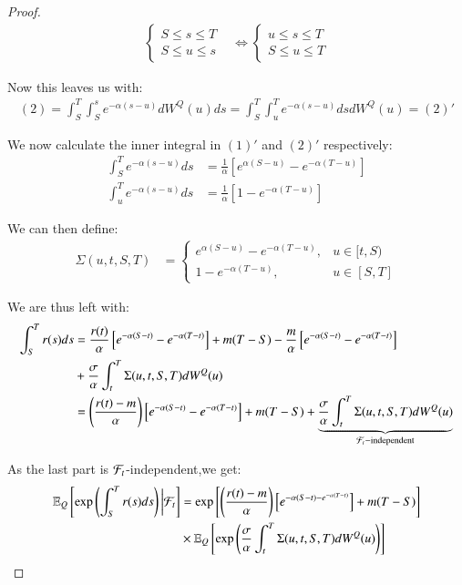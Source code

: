 \begin{proof}
\begin{align*}
\begin{cases}
 S \leq s \leq T \\ 
 S \leq u \leq s
\end{cases}
&\iff
\begin{cases}
 u \leq s \leq T \\ 
 S \leq u \leq T
\end{cases}
\end{align*}

Now this leaves us with: 
\begin{align*}
(2) =\int_{S}^{T}\int_{S}^{s}e^{-\alpha(s-u)}dW^{Q}(u)ds 
=
\int_{S}^{T}\int_{u}^{T}e^{-\alpha(s-u)}dsdW^{Q}(u) = (2)'
\end{align*}

We now calculate the inner integral in $(1)'$ and $(2)'$ respectively: 
\begin{align*}
\int_{S}^{T}e^{-\alpha(s-u)}ds &= \frac{1}{\alpha}\left[
e^{\alpha(S-u)}-e^{-\alpha(T-u)}
\right] \\ 
\int_{u}^{T}e^{-\alpha(s-u)}ds &= \frac{1}{\alpha}\left[
1 -e^{-\alpha(T-u)}
\right]
\end{align*}

We can then define: 
\begin{align*}
\Sigma(u,t,S,T) &= 
    \begin{cases}
      e^{\alpha(S-u)}-e^{-\alpha(T-u)},  & u \in [t,S)\\
      1 -e^{-\alpha(T-u)}, & u\in [S,T]
    \end{cases}
\end{align*}

We are thus left with: 
\begin{align}
\label{eq: Vasicek_closed_expr_3M_SOFR}
\int_{S}^{T}r(s)ds &= \frac{r(t)}{\alpha}\left[
e^{-\alpha(S-t)} - e^{-\alpha(T-t)}
\right]   
+ m(T-S) - \frac{m}{\alpha}\left[
e^{-\alpha(S-t)} - e^{-\alpha(T-t)}
\right] \nonumber \\
&+ \frac{\sigma}{\alpha}\int_{t}^{T}\Sigma(u,t,S,T)dW^{Q}(u)\nonumber \\ 
&= 
\left(
\frac{r(t)-m}{\alpha}
\right)
\left[
e^{-\alpha(S-t)} - e^{-\alpha(T-t)}
\right]
+ m(T-S) 
+ 
\underbrace{
\frac{\sigma}{\alpha}\int_{t}^{T}\Sigma(u,t,S,T)dW^{Q}(u)
}_{\mathcal{F}_{t}-\text{independent}}
\end{align}


As the last part is $\mathcal{F}_{t}$-independent,we get: 
\begin{align*}
\mathbb{E}_{Q}\left[
\exp\left(
\int_{S}^{T}r(s)ds
\right)\bigg{|}\mathcal{F}_{t}
\right] 
&= 
\exp\left[
\left(
\frac{r(t)-m}{\alpha}
\right)
\left[
e^{-\alpha(S-t) - e^{-\alpha(T-t)}}
\right]
+ m(T-S) 
\right] \\
&\times  
\mathbb{E}_{Q}\left[
\exp\left(
\frac{\sigma}{\alpha}\int_{t}^{T}\Sigma(u,t,S,T)dW^{Q}(u)
\right)
\right]
\end{align*}


\end{proof}
